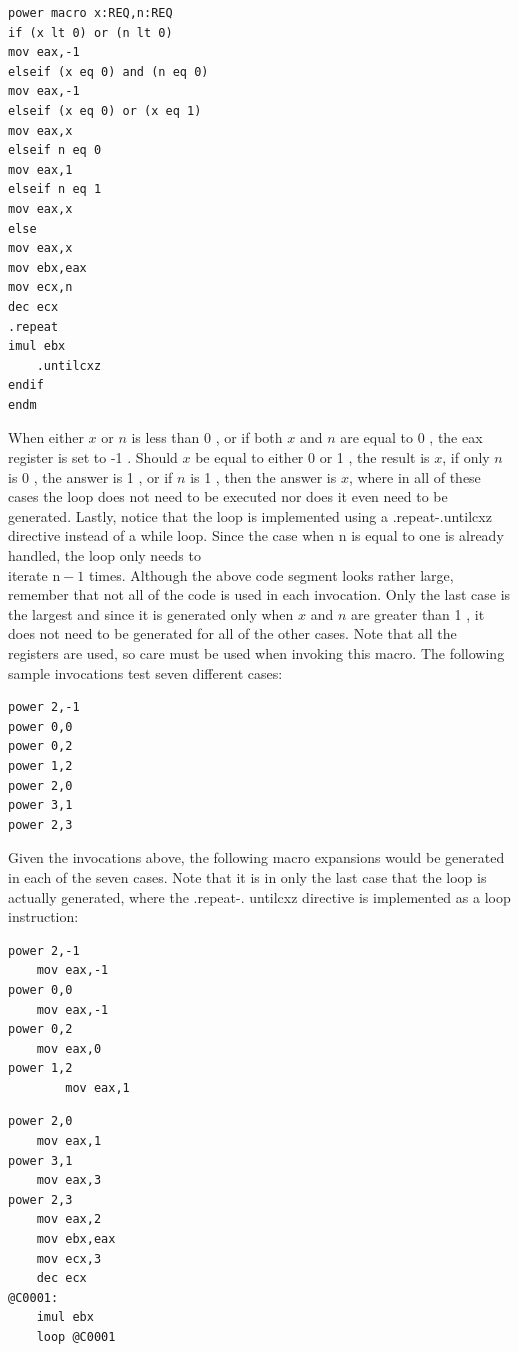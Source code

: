 \documentclass[10pt]{book}
\begin{document}
\begin{center}
\begin{center}
\begin{verbatim}
power macro x:REQ,n:REQ
if (x lt 0) or (n lt 0)
mov eax,-1
elseif (x eq 0) and (n eq 0)
mov eax,-1
elseif (x eq 0) or (x eq 1)
mov eax,x
elseif n eq 0
mov eax,1
elseif n eq 1
mov eax,x
else
mov eax,x
mov ebx,eax
mov ecx,n
dec ecx
.repeat
imul ebx
    .untilcxz
endif
endm
\end{verbatim}

When either $x$ or $n$ is less than 0 , or if both $x$ and $n$ are equal to 0 , the eax register is set to -1 . Should $x$ be equal to either 0 or 1 , the result is $x$, if only $n$ is 0 , the answer is 1 , or if $n$ is 1 , then the answer is $x$, where in all of these cases the loop does not need to be executed nor does it even need to be generated. Lastly, notice that the loop is implemented using a .repeat-.untilcxz directive instead of a while loop. Since the case when n is equal to one is already handled, the loop only needs to\\
iterate $\mathrm{n}-1$ times. Although the above code segment looks rather large, remember that not all of the code is used in each invocation. Only the last case is the largest and since it is generated only when $x$ and $n$ are greater than 1 , it does not need to be generated for all of the other cases. Note that all the registers are used, so care must be used when invoking this macro. The following sample invocations test seven different cases:


\begin{verbatim}
power 2,-1
power 0,0
power 0,2
power 1,2
power 2,0
power 3,1
power 2,3
\end{verbatim}

Given the invocations above, the following macro expansions would be generated in each of the seven cases. Note that it is in only the last case that the loop is actually generated, where the .repeat-. untilcxz directive is implemented as a loop instruction:

\begin{verbatim}
power 2,-1
    mov eax,-1
power 0,0
    mov eax,-1
power 0,2
    mov eax,0
power 1,2
        mov eax,1
\end{verbatim}

\begin{verbatim}
power 2,0
    mov eax,1
power 3,1
    mov eax,3
power 2,3
    mov eax,2
    mov ebx,eax
    mov ecx,3
    dec ecx
@C0001:
    imul ebx
    loop @C0001
\end{verbatim}


\end{center}
\end{center}
\end{document}
